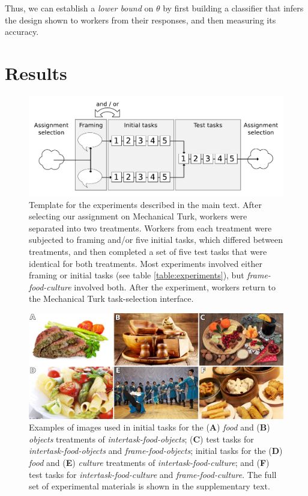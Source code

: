 \documentclass{sigchi}
\begin{document}
Thus, we can establish a \textit{lower bound} on $\theta$ by first 
building a classifier that infers the design shown to workers from their 
responses, and then measuring its accuracy.

\section{Results}
\begin{figure}
	\includegraphics[scale=0.36]{figs/task-schematic-2.pdf}
	\caption{
	  Template for the experiments described in the main text.
	  After selecting our assignment on Mechanical 
	  Turk, workers were separated into two treatments.
	  Workers from each treatment were subjected to framing and/or
	  five initial tasks, which differed between treatments, and then 
	  completed a set of five test tasks that were identical for both
	  treatments.  Most experiments involved either framing or initial
	  tasks (see table \ref{table:experiments}), 
	  but \textit{frame-food-culture} involved both.
	  After the experiment, workers return to the Mechanical Turk 
	  task-selection interface.
	}
	\label{fig:task-schematic}
\end{figure}


\begin{figure}
	\centering
	\includegraphics[scale=1.0]{figs/images.jpg}
	\caption{
		Examples of images used in
		initial tasks for the (\textbf{A}) \textit{food} and (\textbf{B}) 
		\textit{objects} treatments of \textit{intertask-food-objects};
		(\textbf{C}) test tasks for \textit{intertask-food-objects} and 
		\textit{frame-food-objects};
		initial tasks for the (\textbf{D}) \textit{food} and (\textbf{E}) 
		\textit{culture} treatments of \textit{intertask-food-culture};
		and (\textbf{F}) test tasks for \textit{intertask-food-culture} and 
		\textit{frame-food-culture}.
		The full set of experimental materials is shown in the 
		supplementary text.
	}

	\label{fig:task}
\end{figure}
\end{document}
